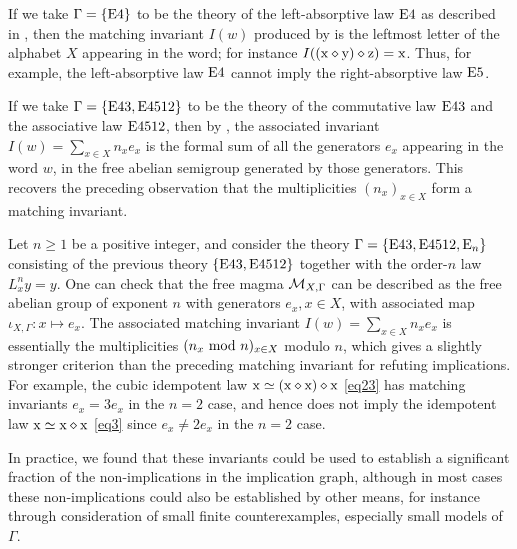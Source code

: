 \begin{example}  If we take $\Gamma = \{\mathrm{E}4\}$ to be the theory of the left-absorptive law $\mathrm{E}4$ as described in , then the matching invariant $I(w)$ produced by  is the leftmost letter of the alphabet $X$ appearing in the word; for instance $I((\mathrm{x} \diamond \mathrm{y}) \diamond \mathrm{z}) = \mathrm{x}$.  Thus, for example, the left-absorptive law $\mathrm{E}4$ cannot imply the right-absorptive law $\mathrm{E}5$.
\end{example}

\begin{example}  If we take $\Gamma = \{\mathrm{E}43, \mathrm{E}4512\}$ to be the theory of the commutative law $\mathrm{E}43$ and the associative law $\mathrm{E}4512$, then by , the associated invariant $I(w) = \sum_{x \in X} n_x e_x$ is the formal sum of all the generators $e_x$ appearing in the word $w$, in the free abelian semigroup generated by those generators.  This recovers the preceding observation that the multiplicities $(n_x)_{x \in X}$ form a matching invariant.
\end{example}

\begin{example}  Let $n \geq 1$ be a positive integer, and consider the theory $\Gamma = \{\mathrm{E}43, \mathrm{E}4512, \mathrm{E}_n\}$ consisting of the previous theory $\{\mathrm{E}43, \mathrm{E}4512\}$ together with the order-$n$ law $L_x^n y = y$.  One can check that the free magma ${\mathcal{M}}_{X,\Gamma}$ can be described as the free abelian group of exponent $n$ with generators $e_x, x \in X$, with associated map $\iota_{X,\Gamma} \colon x \mapsto e_x$.  The associated matching invariant $I(w) = \sum_{x \in X} n_x e_x$ is essentially the multiplicities $(n_x \hbox{ mod } n)_{x \in X}$ modulo $n$, which gives a slightly stronger criterion than the preceding matching invariant for refuting implications.  For example, the cubic idempotent law $\mathrm{x} \simeq (\mathrm{x} \diamond \mathrm{x}) \diamond \mathrm{x}$ \eqref{eq23}
has matching invariants $e_x = 3e_x$ in the $n=2$ case, and hence does not imply the idempotent law $\mathrm{x} \simeq \mathrm{x} \diamond \mathrm{x}$ \eqref{eq3} since $e_x \neq 2e_x$ in the $n=2$ case.
\end{example}

In practice, we found that these invariants could be used to establish a significant fraction of the non-implications in the implication graph, although in most cases these non-implications could also be established by other means, for instance through consideration of small finite counterexamples, especially small models of~$\Gamma$.

